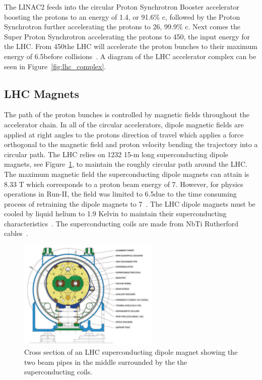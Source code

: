 The LINAC2 feeds into the circular Proton Synchrotron Booster accelerator boosting
the protons to an energy of 1.4\GeV, or 91.6\% c, followed by the Proton Synchrotron further
accelerating the protons to 26\GeV, 99.9\% c. Next comes the Super Proton Synchrotron
accelerating the protons to 450\GeV, the input energy for the LHC. From 450\GeV the LHC 
will accelerate the proton bunches to their maximum energy of 6.5\TeV before 
collisions~\cite{Voss:2009zz}.
A diagram of the LHC accelerator complex can be seen in Figure~\ref{fig:lhc_complex}.



\subsection{LHC Magnets}
The path of the proton bunches is controlled by magnetic fields throughout
the accelerator chain. In all of the circular accelerators, dipole magnetic fields are applied
at right angles to the protons direction of travel which applies a force orthogonal to
the magnetic field and proton velocity bending the trajectory into a circular path. The LHC
relies on 1232 15-m long superconducting dipole magnets, see Figure~\ref{fig:lhc_dipole},
to maintain the roughly circular path around the LHC.
The maximum magnetic field the superconducting dipole magnets can attain is 8.33 T which
corresponds to a proton beam energy of 7\TeV. However, for physics operations in Run-II, the field was limited to 
6.5\TeV due to the time consuming process of retraining the dipole magnets to 7\TeV~\cite{7372416-ieee-dipole}.
The LHC dipole magnets must be cooled by liquid helium to 1.9 Kelvin to maintain their superconducting
characteristics~\cite{lhc_magnets}. The superconducting coils are made from NbTi Rutherford
cables~\cite{1018583}.

\begin{figure}[htbp]
\centering
     \includegraphics[width=0.6\textwidth]{cms_and_lhc/plots/lhc_dipole_cross_section.pdf}
     \caption{
Cross section of an LHC superconducting dipole magnet showing the two beam pipes in the middle
surrounded by the the superconducting coils.
     }
     \label{fig:lhc_dipole}
\end{figure}

